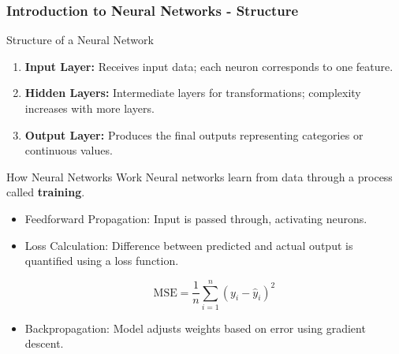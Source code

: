 \documentclass[aspectratio=169]{beamer}
\begin{document}
\begin{frame}[fragile]
    \frametitle{Introduction to Neural Networks - Structure}
    \begin{block}{Structure of a Neural Network}
        \begin{enumerate}
            \item \textbf{Input Layer:} Receives input data; each neuron corresponds to one feature.
            \item \textbf{Hidden Layers:} Intermediate layers for transformations; complexity increases with more layers.
            \item \textbf{Output Layer:} Produces the final outputs representing categories or continuous values.
        \end{enumerate}
    \end{block}

    \begin{block}{How Neural Networks Work}
        Neural networks learn from data through a process called \textbf{training}. 
        \begin{itemize}
            \item Feedforward Propagation: Input is passed through, activating neurons.
            \item Loss Calculation: Difference between predicted and actual output is quantified using a loss function.
            
            \begin{equation}
            \text{MSE} = \frac{1}{n} \sum_{i=1}^{n} (y_i - \hat{y}_i)^2
            \end{equation}
            
            \item Backpropagation: Model adjusts weights based on error using gradient descent.
        \end{itemize}
    \end{block}
\end{frame}
\end{document}
